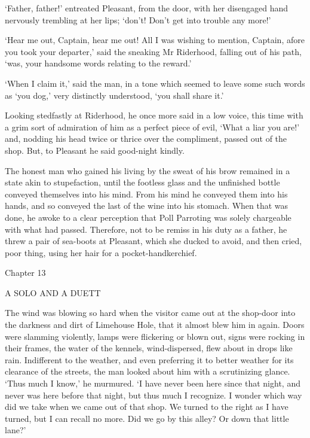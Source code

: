 ‘Father, father!’ entreated Pleasant, from the door, with her disengaged
hand nervously trembling at her lips; ‘don’t! Don’t get into trouble any
more!’

‘Hear me out, Captain, hear me out! All I was wishing to mention,
Captain, afore you took your departer,’ said the sneaking Mr Riderhood,
falling out of his path, ‘was, your handsome words relating to the
reward.’

‘When I claim it,’ said the man, in a tone which seemed to leave some
such words as ‘you dog,’ very distinctly understood, ‘you shall share
it.’

Looking stedfastly at Riderhood, he once more said in a low voice, this
time with a grim sort of admiration of him as a perfect piece of evil,
‘What a liar you are!’ and, nodding his head twice or thrice over the
compliment, passed out of the shop. But, to Pleasant he said good-night
kindly.

The honest man who gained his living by the sweat of his brow remained
in a state akin to stupefaction, until the footless glass and the
unfinished bottle conveyed themselves into his mind. From his mind he
conveyed them into his hands, and so conveyed the last of the wine into
his stomach. When that was done, he awoke to a clear perception that
Poll Parroting was solely chargeable with what had passed. Therefore,
not to be remiss in his duty as a father, he threw a pair of sea-boots
at Pleasant, which she ducked to avoid, and then cried, poor thing,
using her hair for a pocket-handkerchief.



Chapter 13

A SOLO AND A DUETT


The wind was blowing so hard when the visitor came out at the shop-door
into the darkness and dirt of Limehouse Hole, that it almost blew him
in again. Doors were slamming violently, lamps were flickering or blown
out, signs were rocking in their frames, the water of the kennels,
wind-dispersed, flew about in drops like rain. Indifferent to the
weather, and even preferring it to better weather for its clearance of
the streets, the man looked about him with a scrutinizing glance. ‘Thus
much I know,’ he murmured. ‘I have never been here since that night, and
never was here before that night, but thus much I recognize. I wonder
which way did we take when we came out of that shop. We turned to the
right as I have turned, but I can recall no more. Did we go by this
alley? Or down that little lane?’

